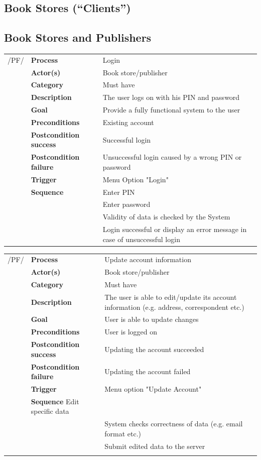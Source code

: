 \documentclass[11pt,a4paper,oneside,svgnames]{report}
\begin{document}
\subsection{Book Stores (``Clients'')}

\subsection{Book Stores and Publishers}

\noindent
\begin{tabular}{p{1.5cm}p{3cm}p{8cm}}
/PF/	& \textbf{Process} & Login\\
		& \textbf{Actor(s)} & Book store/publisher\\
		& \textbf{Category} & Must have\\
		& \textbf{Description}	 & The user logs on with his PIN and password\\
		& \textbf{Goal} & Provide a fully functional system to the user\\
		& \textbf{Preconditions} & Existing account\\
		& \textbf{Postcondition success} & Successful login\\
		& \textbf{Postcondition failure} & Unsuccessful login caused by a wrong PIN or password\\
		& \textbf{Trigger} & Menu Option "Login"\\
		& \textbf{Sequence} & Enter PIN\\
		& & Enter password\\
		& & Validity of data is checked by the System\\
		& & Login successful or display an error message in case of unsuccessful login
		
\hfill \\
\end{tabular}

\noindent
\begin{tabular}{p{1.5cm}p{3cm}p{8cm}}
/PF/	& \textbf{Process} & Update account information\\
		& \textbf{Actor(s)} & Book store/publisher\\
		& \textbf{Category} & Must have\\
		& \textbf{Description}	 & The user is able to edit/update its account information (e.g. address, correspondent etc.)\\
		& \textbf{Goal} & User is able to update changes\\
		& \textbf{Preconditions} & User is logged on\\
		& \textbf{Postcondition success} & Updating the account succeeded\\
		& \textbf{Postcondition failure} & Updating the account failed\\
		& \textbf{Trigger} & Menu option "Update Account"\\
		& \textbf{Sequence} Edit specific data\\
		& & System checks correctness of data (e.g. email format etc.)\\
		& & Submit edited data to the server\\
		
\hfill \\
\end{tabular}
\end{document}
